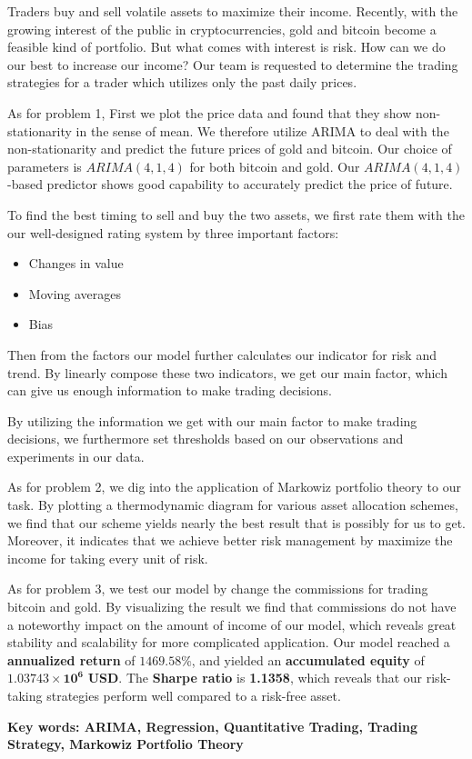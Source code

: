 \documentclass[12pt,a4paper]{article}
\newcommand{\Predictor}{ARIMA }
\begin{document}
\begin{spacing}{1.2}   %



Traders buy and sell volatile assets to maximize their income. Recently, with the growing interest of the public in cryptocurrencies, gold and bitcoin become a feasible kind of portfolio. But what comes with interest is risk. How can we do our best to increase our income? Our team is requested to determine the trading strategies for a trader which utilizes only the past daily prices. 

As for problem 1, First we plot the price data and found that they show non-stationarity in the sense of mean. We therefore utilize \Predictor to deal with the non-stationarity and predict the future prices of gold and bitcoin. Our choice of parameters is $ARIMA(4,1,4)$ for both bitcoin and gold. Our $ARIMA(4,1,4)$-based predictor shows good capability to accurately predict the price of future.

To find the best timing to sell and buy the two assets, we first rate them with the our well-designed rating system by three important factors:

\begin{itemize}
	\item Changes in value
	\item Moving averages
	\item Bias
\end{itemize}
 

Then from the factors our model further calculates our indicator for risk and trend. By linearly compose these two indicators, we get our main factor, which can give us enough information to make trading decisions.

By utilizing the information we get with our main factor to make trading decisions, we furthermore set thresholds based on our observations and experiments in our data. 

As for problem 2, we dig into the application of Markowiz portfolio theory to our task. By plotting a thermodynamic diagram for various asset allocation schemes, we find that our scheme yields nearly the best result that is possibly for us to get. Moreover, it indicates that we achieve better risk management by maximize the income for taking every unit of risk.

As for problem 3, we test our model by change the commissions for trading bitcoin and gold. By visualizing the result we find that commissions do not have a noteworthy impact on the amount of income of our model, which reveals great stability and scalability for more complicated application. Our model reached a \textbf{annualized return} of $\mathbf{1469.58\%}$, and yielded an \textbf{accumulated equity} of $\mathbf{1.03743 \times 10^6}$ \textbf{USD}. The \textbf{Sharpe ratio} is \textbf{1.1358}, which reveals that our risk-taking strategies perform well compared to a risk-free asset.


\textbf{Key words: ARIMA, Regression, Quantitative Trading, Trading Strategy, Markowiz Portfolio Theory} 

\end{spacing}
\end{document}
